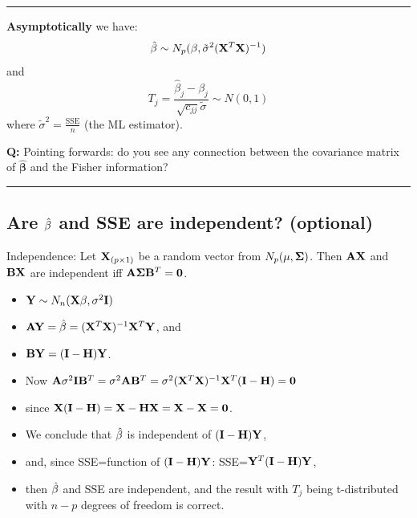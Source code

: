 \documentclass[
]{article}
\begin{document}
\begin{center}\rule{0.5\linewidth}{0.5pt}\end{center}

\textbf{Asymptotically} we have:
\[\hat{\beta}\sim N_{p}(\beta,\tilde{\sigma}^2({\bf X}^T{\bf X})^{-1})\]
and
\[ T_j=\frac{\hat{\beta}_j-\beta_j}{\sqrt{c_{jj}}\tilde{\sigma}}\sim N(0,1)\]
where \(\tilde{\sigma}^2=\frac{\text{SSE}}{n}\) (the ML estimator).

\textbf{Q:} Pointing forwards: do you see any connection between the
covariance matrix of \(\hat{\boldsymbol{\beta}}\) and the Fisher
information?

\begin{center}\rule{0.5\linewidth}{0.5pt}\end{center}

\hypertarget{are-hatbf-beta-and-sse-are-independent-optional}{%
\subsection{\texorpdfstring{Are \(\hat{{\bf \beta}}\) and SSE are
independent?
(optional)}{Are \textbackslash hat\{\{\textbackslash bf \textbackslash beta\}\} and SSE are independent? (optional)}}\label{are-hatbf-beta-and-sse-are-independent-optional}}

Independence: Let \({\bf X}_{(p \times 1)}\) be a random vector from
\(N_p({\bf \mu},{\boldsymbol \Sigma})\). Then \({\bf A}{\bf X}\) and
\({\bf B}{\bf X}\) are independent iff
\({\bf A}{\boldsymbol \Sigma}{\bf B}^T={\bf 0}\).

\begin{itemize}
\item
  \({\bf Y}\sim N_n({\bf X}{\bf \beta},\sigma^2{\bf I})\)
\item
  \({\bf AY}=\hat{{\bf \beta}}=({\bf X}^T{\bf X})^{-1}{\bf X}^T {\bf Y}\),
  and
\item
  \({\bf BY}=({\bf I}-{\bf H}){\bf Y}\).
\item
  Now
  \({\bf A}\sigma^2{\bf I}{\bf B}^T=\sigma^2 {\bf A}{\bf B}^T=\sigma^2 ({\bf X}^T{\bf X})^{-1}{\bf X}^T ({\bf I}-{\bf H})={\bf 0}\)
\item
  since
  \({\bf X}({\bf I}-{\bf H})={\bf X}-{\bf HX}={\bf X}-{\bf X}={\bf 0}\).
\item
  We conclude that \(\hat{{\bf \beta}}\) is independent of
  \(({\bf I}-{\bf H}){\bf Y}\),
\item
  and, since SSE=function of \(({\bf I}-{\bf H}){\bf Y}\):
  SSE=\({\bf Y}^T({\bf I}-{\bf H}){\bf Y}\),
\item
  then \(\hat{{\bf \beta}}\) and SSE are independent, and the result
  with \(T_j\) being t-distributed with \(n-p\) degrees of freedom is
  correct.
\end{itemize}
\end{document}
